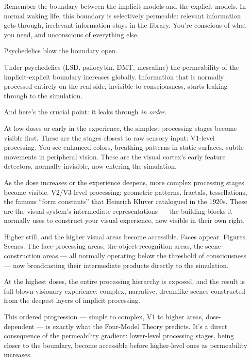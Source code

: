 \documentclass[11pt, twoside, openright]{book}
\begin{document}
Remember the boundary between the implicit models and the explicit models. In normal waking life, this boundary is selectively permeable: relevant information gets through, irrelevant information stays in the library. You're conscious of what you need, and unconscious of everything else.

Psychedelics blow the boundary open.

Under psychedelics (LSD, psilocybin, DMT, mescaline) the permeability of the implicit-explicit boundary increases globally. Information that is normally processed entirely on the real side, invisible to consciousness, starts leaking through to the simulation.

And here's the crucial point: it leaks through \textit{in order}.

At low doses or early in the experience, the simplest processing stages become visible first. These are the stages closest to raw sensory input: V1-level processing. You see enhanced colors, breathing patterns in static surfaces, subtle movements in peripheral vision. These are the visual cortex's early feature detectors, normally invisible, now entering the simulation.

As the dose increases or the experience deepens, more complex processing stages become visible. V2/\allowbreak{}V3-level processing: geometric patterns, fractals, tessellations, the famous ``form constants'' that Heinrich Klüver catalogued in the 1920s. These are the visual system's intermediate representations --- the building blocks it normally uses to construct your visual experience, now visible in their own right.

Higher still, and the higher visual areas become accessible. Faces appear. Figures. Scenes. The face-processing areas, the object-recognition areas, the scene-construction areas --- all normally operating below the threshold of consciousness --- now broadcasting their intermediate products directly to the simulation.

At the highest doses, the entire processing hierarchy is exposed, and the result is full-blown visionary experience: complex, narrative, dreamlike scenes constructed from the deepest layers of implicit processing.

This ordered progression --- simple to complex, V1 to higher areas, dose-dependent --- is exactly what the Four-Model Theory predicts. It's a direct consequence of the permeability gradient: lower-level processing stages, being closer to the boundary, become accessible before higher-level ones as permeability increases.
\end{document}
